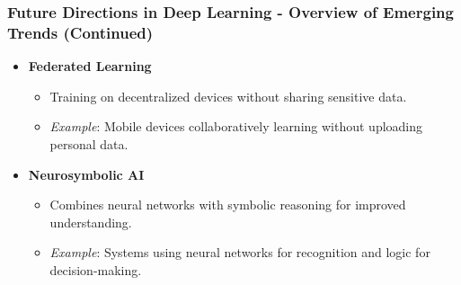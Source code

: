 \documentclass[aspectratio=169]{beamer}
\begin{document}
\begin{frame}[fragile]
    \frametitle{Future Directions in Deep Learning - Overview of Emerging Trends (Continued)}
    \begin{itemize}
        \item \textbf{Federated Learning}
        \begin{itemize}
            \item Training on decentralized devices without sharing sensitive data.
            \item \textit{Example}: Mobile devices collaboratively learning without uploading personal data.
        \end{itemize}

        \item \textbf{Neurosymbolic AI}
        \begin{itemize}
            \item Combines neural networks with symbolic reasoning for improved understanding.
            \item \textit{Example}: Systems using neural networks for recognition and logic for decision-making.
        \end{itemize}
    \end{itemize}
\end{frame}
\end{document}

